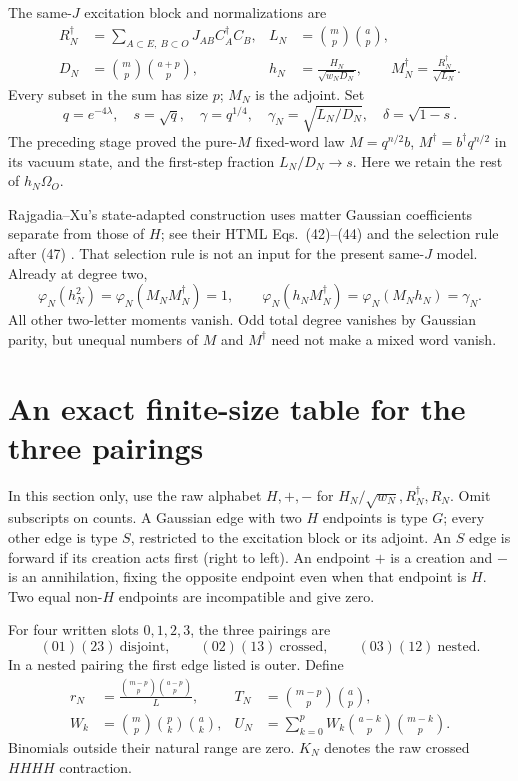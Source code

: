 \documentclass[11pt]{article}
\newcommand{\Om}{\Omega_O}
\newcommand{\ph}{\varphi}
\newcommand{\bn}[2]{\binom{#1}{#2}}
\begin{document}
\newpage
The same-$J$ excitation block and normalizations are
\begin{align}
 R_N^\dagger&=\sum_{A\subset E,\ B\subset O}J_{AB}C_A^\dagger C_B,
 &L_N&=\bn mp\bn ap,\\
 D_N&=\bn mp\bn{a+p}p,
 &h_N&=\frac{H_N}{\sqrt{w_ND_N}},\qquad
 M_N^\dagger=\frac{R_N^\dagger}{\sqrt{L_N}}.
\end{align}
Every subset in the sum has size $p$; $M_N$ is the adjoint.
Set
\begin{equation}
 q=e^{-4\lambda},\quad s=\sqrt q,\quad\gamma=q^{1/4},\quad
 \gamma_N=\sqrt{L_N/D_N},\quad\delta=\sqrt{1-s}.
\end{equation}
The preceding stage proved the pure-$M$ fixed-word law
$M=q^{n/2}b$, $M^\dagger=b^\dagger q^{n/2}$ in its vacuum
state, and the first-step fraction $L_N/D_N\to s$.
Here we retain the rest of $h_N\Om$.

Rajgadia--Xu's state-adapted construction uses matter Gaussian
coefficients separate from those of $H$; see their HTML
Eqs.~(42)--(44) and the selection rule after (47) \cite{RX}.
That selection rule is not an input for the present same-$J$ model.
Already at degree two,
\begin{equation}\label{second}
 \ph_N(h_N^2)=\ph_N(M_NM_N^\dagger)=1,\qquad
 \ph_N(h_NM_N^\dagger)=\ph_N(M_Nh_N)=\gamma_N.
\end{equation}
All other two-letter moments vanish. Odd total degree vanishes by
Gaussian parity, but unequal numbers of $M$ and $M^\dagger$ need
not make a mixed word vanish.

\section{An exact finite-size table for the three pairings}
In this section only, use the raw alphabet $H,+,-$ for
$H_N/\sqrt{w_N},R_N^\dagger,R_N$. Omit subscripts on counts.
A Gaussian edge with two $H$ endpoints is type $G$; every other
edge is type $S$, restricted to the excitation block or its adjoint.
An $S$ edge is forward if its creation acts first (right to left).
An endpoint $+$ is a creation and $-$ is an annihilation, fixing the
opposite endpoint even when that endpoint is $H$.
Two equal non-$H$ endpoints are incompatible and give zero.

For four written slots $0,1,2,3$, the three pairings are
\begin{equation}
 (01)(23)\ \text{disjoint},\qquad
 (02)(13)\ \text{crossed},\qquad
 (03)(12)\ \text{nested}.
\end{equation}
In a nested pairing the first edge listed is outer. Define
\begin{align}
 r_N&=\frac{\bn{m-p}p\bn{a-p}p}{L},
 &T_N&=\bn{m-p}p\bn ap,\\
 W_k&=\bn mp\bn pk\bn ak,
 &U_N&=\sum_{k=0}^p W_k\bn{a-k}p\bn{m-k}p.
\end{align}
Binomials outside their natural range are zero. $K_N$ denotes
the raw crossed $HHHH$ contraction.
\end{document}
